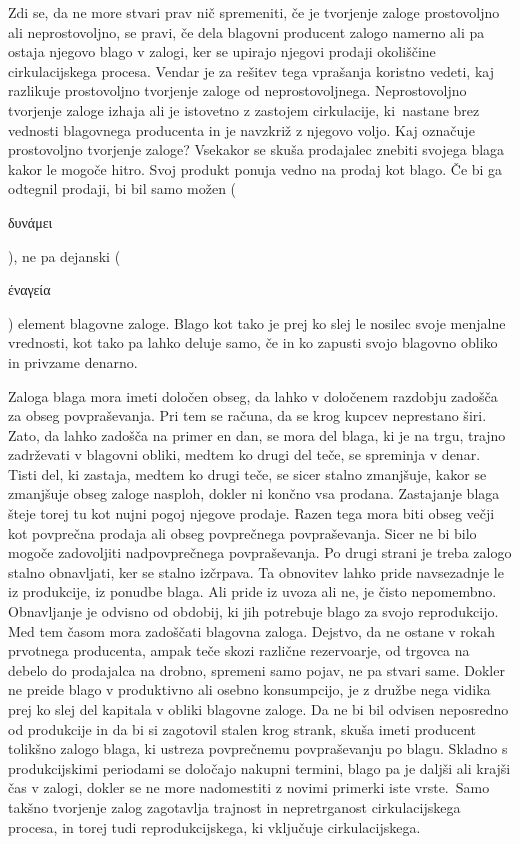 \documentclass[kapital_02.tex]{subfiles}
\begin{document}
Zdi se, da ne more stvari prav nič spremeniti, če je tvorjenje zaloge prostovoljno ali neprostovoljno, se pravi, če dela blagovni producent zalogo namerno ali pa ostaja njegovo blago v zalogi, ker se upirajo njegovi prodaji okoliščine cirkulacijskega procesa.
Vendar je za rešitev tega vprašanja koristno vedeti, kaj razlikuje prostovoljno tvorjenje zaloge od neprostovoljnega. 
Neprostovoljno tvorjenje zaloge izhaja ali je istovetno z zastojem cirkulacije, ki\KPEstran\ nastane brez vednosti blagovnega producenta in je navzkriž z njegovo voljo.
Kaj označuje prostovoljno tvorjenje zaloge?
Vsekakor se skuša prodajalec znebiti svojega blaga kakor le mogoče hitro. 
Svoj produkt ponuja vedno na prodaj kot blago.
Če bi ga odtegnil prodaji, bi bil samo možen (\begin{otherlanguage}{greek}δυνάμει\end{otherlanguage}), ne pa dejanski (\begin{otherlanguage}{greek}έναγεία\end{otherlanguage}) element blagovne zaloge.
Blago kot tako je prej ko slej le nosilec svoje menjalne vrednosti, kot tako pa lahko deluje samo, če in ko zapusti svojo blagovno obliko in privzame denarno.

Zaloga blaga mora imeti določen obseg, da lahko v določenem razdobju zadošča za obseg povpraševanja.
Pri tem se računa, da se krog kupcev neprestano širi.
Zato, da lahko zadošča na primer en dan, se mora del blaga, ki je na trgu, trajno zadrževati v blagovni obliki, medtem ko drugi del teče, se spreminja v denar.
Tisti del, ki zastaja, medtem ko drugi teče, se sicer stalno zmanjšuje, kakor se zmanjšuje obseg zaloge nasploh, dokler ni končno vsa prodana.
Zastajanje blaga šteje torej tu kot nujni pogoj njegove prodaje.
Razen tega mora biti obseg večji kot povprečna prodaja ali obseg povprečnega povpraševanja.
Sicer ne bi bilo mogoče zadovoljiti nadpovprečnega povpraševanja.
Po drugi strani je treba zalogo stalno obnavljati, ker se stalno izčrpava.
Ta obnovitev lahko pride navsezadnje le iz produkcije, iz ponudbe blaga.
Ali pride iz uvoza ali ne, je čisto nepomembno.
Obnavljanje je odvisno od obdobij, ki jih potrebuje blago za svojo reprodukcijo.
Med tem časom mora zadoščati blagovna zaloga.
Dejstvo, da ne ostane v rokah prvotnega producenta, ampak teče skozi različne rezervoarje, od trgovca na debelo do prodajalca na drobno, spremeni samo pojav, ne pa stvari same. Dokler ne preide blago v produktivno ali osebno konsumpcijo, je z družbe nega vidika prej ko slej del kapitala v obliki blagovne zaloge.
Da ne bi bil odvisen neposredno od produkcije in da bi si zagotovil stalen krog strank, skuša imeti producent tolikšno zalogo blaga, ki ustreza povprečnemu povpraševanju po blagu. 
Skladno s produkcijskimi periodami se določajo nakupni termini, blago pa je daljši ali krajši čas v zalogi, dokler se ne more nadomestiti z novimi primerki
iste vrste.\KPEstran\ Samo takšno tvorjenje zalog zagotavlja trajnost in nepretrganost cirkulacijskega procesa, in torej tudi reprodukcijskega, ki vključuje cirkulacijskega.
\end{document}
